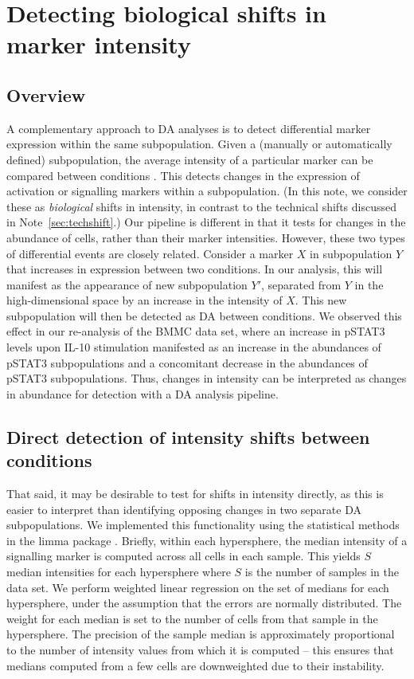 \documentclass{article}
\begin{document}
\section{Detecting biological shifts in marker intensity}

\subsection{Overview}
A complementary approach to DA analyses is to detect differential marker expression within the same subpopulation.
Given a (manually or automatically defined) subpopulation, the average intensity of a particular marker can be compared between conditions \cite{behbehani2015mass,anchang2016visualization}.
This detects changes in the expression of activation or signalling markers within a subpopulation.
(In this note, we consider these as \textit{biological} shifts in intensity, in contrast to the technical shifts discussed in Note~\ref{sec:techshift}.)
Our pipeline is different in that it tests for changes in the abundance of cells, rather than their marker intensities.
However, these two types of differential events are closely related.
Consider a marker $X$ in subpopulation $Y$ that increases in expression between two conditions. 
In our analysis, this will manifest as the appearance of new subpopulation $Y'$, separated from $Y$ in the high-dimensional space by an increase in the intensity of $X$.
This new subpopulation will then be detected as DA between conditions.
We observed this effect in our re-analysis of the BMMC data set, where an increase in pSTAT3 levels upon IL-10 stimulation manifested as an increase in the abundances of pSTAT3\hi{} subpopulations and a concomitant decrease in the abundances of pSTAT3\lo{} subpopulations.
Thus, changes in intensity can be interpreted as changes in abundance for detection with a DA analysis pipeline.

\subsection{Direct detection of intensity shifts between conditions}
That said, it may be desirable to test for shifts in intensity directly, as this is easier to interpret than identifying opposing changes in two separate DA subpopulations.
We implemented this functionality using the statistical methods in the limma package \cite{smyth2004linear}.
Briefly, within each hypersphere, the median intensity of a signalling marker is computed across all cells in each sample.
This yields $S$ median intensities for each hypersphere where $S$ is the number of samples in the data set.
We perform weighted linear regression on the set of medians for each hypersphere, under the assumption that the errors are normally distributed.
The weight for each median is set to the number of cells from that sample in the hypersphere.
The precision of the sample median is approximately proportional to the number of intensity values from which it is computed \cite{rider1960variance} -- this ensures that medians computed from a few cells are downweighted due to their instability.
\end{document}
